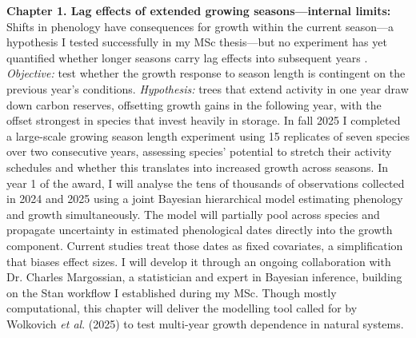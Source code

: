 \documentclass[12pt]{article}
\begin{document}
\textbf{Chapter 1. Lag effects of extended growing seasons---internal limits:}
Shifts in phenology have consequences for growth within the current season---a hypothesis I tested successfully in my MSc thesis---but no experiment has yet quantified whether longer seasons carry lag effects into subsequent years \cite{chapin_ecology_1990,landhausser_partitioning_2012,schott_premature_2013}. \textit{Objective:} test whether the growth response to season length is contingent on the previous year's conditions. \textit{Hypothesis:} trees that extend activity in one year draw down carbon reserves, offsetting growth gains in the following year, with the offset strongest in species that invest heavily in storage. In fall 2025 I completed a large-scale growing season length experiment using 15 replicates of seven species over two consecutive years, assessing species' potential to stretch their activity schedules and whether this translates into increased growth across seasons. In year 1 of the award, I will analyse the tens of thousands of observations collected in 2024 and 2025 using a joint Bayesian hierarchical model estimating phenology and growth simultaneously. The model will partially pool across species and propagate uncertainty in estimated phenological dates directly into the growth component. Current studies treat those dates as fixed covariates, a simplification that biases effect sizes. I will develop it through an ongoing collaboration with Dr. Charles Margossian, a statistician and expert in Bayesian inference, building on the Stan workflow I established during my MSc. Though mostly computational, this chapter will deliver the modelling tool called for by Wolkovich \textit{et al}. (2025) to test multi-year growth dependence in natural systems.
\end{document}
